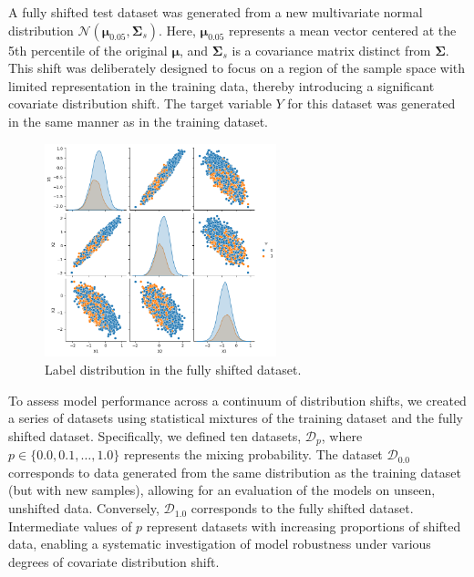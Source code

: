 A fully shifted test dataset was generated from a new multivariate normal distribution $\mathcal{N}(\boldsymbol{\mu}_{0.05}, \boldsymbol{\Sigma}_s)$. Here, $\boldsymbol{\mu}_{0.05}$ represents a mean vector centered at the 5th percentile of the original $\boldsymbol{\mu}$, and $\boldsymbol{\Sigma}_s$ is a covariance matrix distinct from $\boldsymbol{\Sigma}$. This shift was deliberately designed to focus on a region of the sample space with limited representation in the training data, thereby introducing a significant covariate distribution shift. The target variable $Y$ for this dataset was generated in the same manner as in the training dataset.

\begin{figure}
    \centering
    \includegraphics[width=0.6\textwidth]{assets/label_dist_fullyshift.png}
    \caption{Label distribution in the fully shifted dataset.}
    \label{fig:label_dist_fullyshift}
\end{figure}

To assess model performance across a continuum of distribution shifts, we created a series of datasets using statistical mixtures of the training dataset and the fully shifted dataset. Specifically, we defined ten datasets, $\mathcal{D}_p$, where $p \in \{0.0, 0.1, \ldots, 1.0\}$ represents the mixing probability. The dataset $\mathcal{D}_{0.0}$ corresponds to data generated from the same distribution as the training dataset (but with new samples), allowing for an evaluation of the models on unseen, unshifted data. Conversely, $\mathcal{D}_{1.0}$ corresponds to the fully shifted dataset. Intermediate values of $p$ represent datasets with increasing proportions of shifted data, enabling a systematic investigation of model robustness under various degrees of covariate distribution shift.

